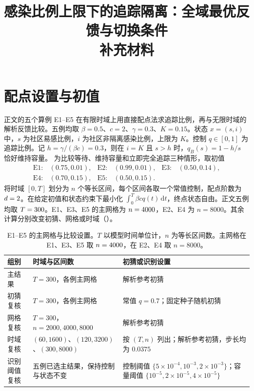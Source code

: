\documentclass[lang=cn,a4paper,newtx]{elegantpaper}
\title{感染比例上限下的追踪隔离：全域最优反馈与切换条件\\[0.4em]\large 补充材料}
\author{}
\date{}
\begin{document}
\maketitle

\section{配点设置与初值}
\label{sec:supp-settings}

正文的五个算例 E1--E5 在有限时域上用直接配点法求追踪比例，再与无限时域的解析反馈比较。五例均取 $\beta=0.5$、$c=2$、$\gamma=0.3$、$K=0.15$。状态 $x=(s,i)$ 中，$s$ 为社区易感比例，$i$ 为社区非隔离感染比例，上限为 $K$。控制 $q\in[0,1]$ 为追踪比例。记 $h=\gamma/(\beta c)=0.3$，则在 $i=K$ 且 $s>h$ 时，$q_B(s)=1-h/s$ 恰好维持容量。
为比较等待、维持容量和立即完全追踪三种情形，取初值
\[
\begin{aligned}
\mathrm{E1}:&(0.75,0.01), &\mathrm{E2}:&(0.99,0.01), &\mathrm{E3}:&(0.50,0.14),\\
\mathrm{E4}:&(0.70,0.15), &\mathrm{E5}:&(0.50,0.15).
\end{aligned}
\]
将时域 $[0,T]$ 划分为 $n$ 个等长区间，每个区间各取一个常值控制，配点阶数为 $d=2$。在给定初值和状态约束下最小化 $\int_0^T\beta cq(t)\,\mathrm dt$，终点状态自由。正文五例均取 $T=300$。E1、E3、E5 的主网格为 $n=4000$，E2、E4 为 $n=8000$。其余计算分别改变初猜、网格或时域（）。

\begin{table}[H]
\centering\small
\caption{E1--E5 的主网格与比较设置。$T$ 以模型时间单位计，$n$ 为等长区间数。主网格在 E1、E3、E5 取 $n=4000$，在 E2、E4 取 $n=8000$。}
\label{tab:supp-settings}
\begin{tabularx}{\linewidth}{@{}>{\raggedright\arraybackslash}p{2.0cm}>{\raggedright\arraybackslash}p{3.4cm}>{\raggedright\arraybackslash}X@{}}
\toprule
组别 & 时域与区间数 & 初猜或识别设置\\
\midrule
主结果 & $T=300$，各例主网格 & 解析参考初猜\\
初猜复核 & $T=300$，各例主网格 & 常值 $q=0.7$；固定种子随机初猜\\
网格复核 & $T=300$，$n=2000,4000,8000$ & 解析参考初猜\\
时域复核 & $(60,1600)$、$(120,3200)$、$(300,8000)$ & 按 $(T,n)$ 列出；解析参考初猜，步长均为 $0.0375$\\
识别阈值复核 & 五例已选主结果，保持控制与状态不变 & 控制阈值 $\{5\!\times\!10^{-4},10^{-3},2\!\times\!10^{-3}\}$；容量阈值 $\{10^{-5},2\!\times\!10^{-5},4\!\times\!10^{-5}\}$\\
\bottomrule
\end{tabularx}
\end{table}
\end{document}
